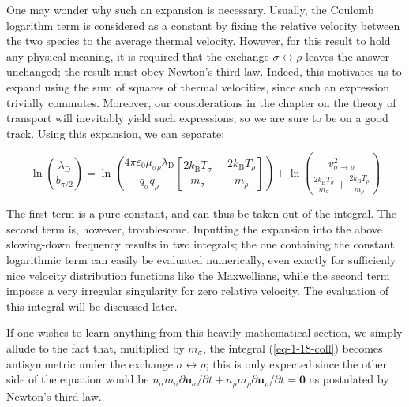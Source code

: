 One may wonder why such an expansion is necessary. Usually, the Coulomb logarithm term is considered as a constant by fixing the relative velocity between the two species to the average thermal velocity. However, for this result to hold any physical meaning, it is required that the exchange $\sigma\leftrightarrow\rho$ leaves the answer unchanged; the result must obey Newton's third law. Indeed, this motivates us to expand using the sum of squares of thermal velocities, since such an expression trivially commutes. Moreover, our considerations in the chapter on the theory of transport will inevitably yield such expressions, so we are sure to be on a good track. Using this expansion, we can separate:

\begin{equation*}
    \ln{\left(\frac{\lambda_{\mathrm{D}}}{b_{\pi/2}}\right)}=\ln{\left(\frac{4\pi \varepsilon_0 \mu_{\sigma\rho}\lambda_{\mathrm{D}}}{q_\sigma q_\rho}\left[\frac{2k_\text{B}T_\sigma}{m_\sigma}+\frac{2k_\text{B}T_\rho}{m_\rho}\right]\right)}+\ln{\left(\frac{v_{\sigma\to\rho}^2}{\frac{2k_\text{B}T_\sigma}{m_\sigma}+\frac{2k_\text{B}T_\rho}{m_\rho}}\right)}
\end{equation*}

The first term is a pure constant, and can thus be taken out of the integral. The second term is, however, troublesome. Inputting the expansion into the above slowing-down frequency results in two integrals; the one containing the constant logarithmic term can easily be evaluated numerically, even exactly for sufficienly nice velocity distribution functions like the Maxwellians, while the second term imposes a very irregular singularity for zero relative velocity. The evaluation of this integral will be discussed later.

\vspace*{2.5pt}

\quad If one wishes to learn anything from this heavily mathematical section, we simply allude to the fact that, multiplied by $m_\sigma$, the integral (\ref{eq-1-18-coll}) becomes antisymmetric under the exchange $\sigma\leftrightarrow\rho$; this is only expected since the other side of the equation would be $n_\sigma m_\sigma\partial\mathbf{u}_\sigma/\partial t+n_\rho m_\rho\partial\mathbf{u}_\rho/\partial t=\mathbf{0}$ as postulated by Newton's third law.

\vspace*{2.5pt}

